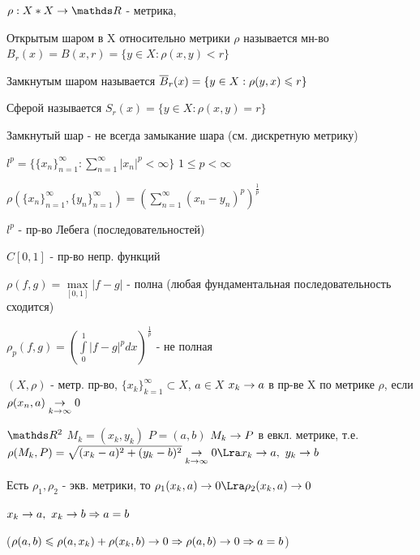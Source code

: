 \documentclass[12pt, fleqn]{article}
\begin{document}
\begin{definition}
    $\rho: X*X \ra \R$ - метрика,

    Открытым шаром в X относительно метрики $\rho$ называется мн-во $B_r(x)=B(x,r)=\{y \in X: \rho(x,y) < r \}$

    Замкнутым шаром называется $\overline{B}_r(x)=\{y \in X: \rho(y,x) \leqslant r \}$

    Сферой называется $S_r(x)=\{y \in X: \rho(x,y)=r \}$
\end{definition}

\begin{upr}
    Замкнутый шар - не всегда замыкание шара (см. дискретную метрику)
\end{upr}

\begin{example}
    $l^p=\{ \{x_n\}_{n=1}^\infty: \sum\limits_{n=1}^\infty |x_n|^p < \infty \}$ $1 \leqslant p < \infty$

    $\rho(\{x_n\}_{n=1}^\infty, \{y_n\}_{n=1}^\infty) = (\sum\limits_{n=1}^\infty (x_n-y_n)^p)^{\frac{1}{p}}$

    $l^p$ - пр-во Лебега (последовательностей)
\end{example}

\begin{example}
    $C[0,1]$ - пр-во непр. функций

    $\rho(f,g)=\max\limits_{[0,1]} |f-g|$ - полна (любая фундаментальная последовательность сходится)

    $\rho_p(f,g)=(\int\limits_0^1 |f-g|^p dx)^{\frac{1}{p}}$ - не полная
\end{example}

\begin{definition}
    $(X, \rho)$ - метр. пр-во, $\{x_k\}_{k=1}^\infty \subset X$, $a \in X$ $x_k \rightarrow a$ в пр-ве X по метрике $\rho$, если $\rho(x_n,a) \underset{k \rightarrow \infty}{\rightarrow} 0$
\end{definition}

\begin{examples}
    $\R^2$ $M_k=(x_k, y_k)$ $P=(a,b)$ $M_k \rightarrow P$ в евкл. метрике, т.е. $\rho(M_k,P)=\sqrt{(x_k-a)^2+(y_k-b)^2} \us{k \ra \infty}{\ra} 0 \Lra x_k \ra a,\ y_k \ra b$
\end{examples}

\begin{remark}
    Есть $\rho_1,\rho_2$ - экв. метрики, то $\rho_1(x_k,a) \ra 0 \Lra \rho_2(x_k,a) \ra 0$
\end{remark}

\begin{upr}
    $x_k \rightarrow a,\ x_k \rightarrow b \Rightarrow a=b$

    ($\rho(a,b) \leqslant \rho(a, x_k) + \rho(x_k,b) \rightarrow 0 \Rightarrow \rho (a,b) \rightarrow 0 \Rightarrow a=b$)
\end{upr}
\end{document}
